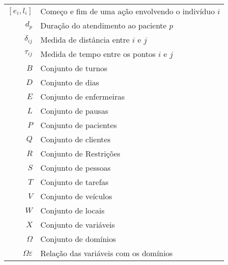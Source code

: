 
\begin{tabular}{rl}
$[e_i,l_i]$ & Começo e fim de uma aç\~ ao envolvendo o indiv\'iduo $i$ \\
$d_p$ & Duraç\~ao do atendimento ao paciente $p$ \\
$\delta_{ij}$ & Medida de distância entre $i$ e $j$ \\
$\tau_{ij}$ & Medida de tempo entre os pontos $i$ e $j$ \\
$B$ & Conjunto de turnos \\
$D$ & Conjunto de dias \\
$E$ & Conjunto de enfermeiras \\
$L$ & Conjunto de pausas \\
$P$ & Conjunto de pacientes \\
$Q$ & Conjunto de clientes \\
$R$ & Conjunto de Restrições \\
$S$ & Conjunto de pessoas \\
$T$ & Conjunto de tarefas \\
$V$ & Conjunto de veículos \\
$W$ & Conjunto de locais \\
$X$ & Conjunto de variáveis \\
$\Omega$ & Conjunto de domínios \\
$\Omega\varepsilon$ & Relação das variáveis com os domínios 
\end{tabular}